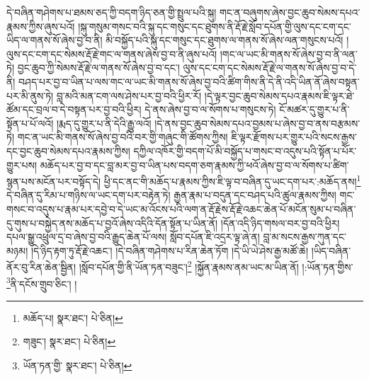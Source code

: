 དེ་བཞིན་གཤེགས་པ་ཐམས་ཅད་ཀྱི་བདག་ཉིད་ཅན་གྱི་སྤྲུལ་པའི་སྐུ། གང་ན་བཞུགས་ཞེས་བྱང་ཆུབ་སེམས་དཔའ་རྣམས་ཀྱིས་ཞུས་པའོ། །སྐུ་གསུམ་གསང་བའི་སྐུ་དང་གསུང་དང་ཐུགས་ནི་རྡོ་རྗེ་སློབ་དཔོན་གྱི་ལུས་དང་ངག་དང་ཡིད་ལ་གནས་སོ་ཞེས་བྱ་བ་ནི། མི་བསྐྱོད་པའི་སྐུ་དང་གསུང་དང་ཐུགས་ལ་གནས་སོ་ཞེས་ལན་གསུངས་པའོ། །ལུས་དང་ངག་དང་སེམས་རྡོ་རྗེ་གང་ལ་གནས་ཞེས་བྱ་བ་ནི་ཞུས་པའོ། །གང་ལ་ཡང་མི་གནས་སོ་ཞེས་བྱ་བ་ནི་ལན་ཏེ། བྱང་ཆུབ་ཀྱི་སེམས་རྡོ་རྗེ་ལ་གནས་སོ་ཞེས་བྱ་བ་དང་། ལུས་དང་ངག་དང་སེམས་རྡོ་རྗེ་ལ་གནས་སོ་ཞེས་བྱ་བ་དེ་ནི། བཤད་པར་བྱ་བ་ཡིན་པ་ལས་གང་ལ་ཡང་མི་གནས་སོ་ཞེས་བྱ་བའི་ཚིག་གིས་ནི་དེ་ནི་འདི་ཡིན་ནོ་ཞེས་བསྟན་པར་མི་ནུས་ཏེ། བླ་མའི་མན་ངག་ལས་ཤེས་པར་བྱ་བའི་ཕྱིར་རོ། །དེ་ལྟར་བྱང་ཆུབ་སེམས་དཔའ་རྣམས་ཇི་ལྟར་ཐེ་ཚོམ་དང་བྲལ་བ་དེ་བསྟན་པར་བྱ་བའི་ཕྱིར། དེ་ནས་ཞེས་བྱ་བ་ལ་སོགས་པ་གསུངས་ཏེ། ངོ་མཚར་དུ་གྱུར་པ་ནི་སྟོན་པ་པོ་ལའོ། །རྨད་དུ་གྱུར་པ་ནི་དེའི་རྒྱུ་ལའོ། །དེ་ནས་བྱང་ཆུབ་སེམས་དཔའ་བྱམས་པ་ཞེས་བྱ་བ་ནས་བརྩམས་ཏེ། གང་ན་ཡང་མི་གནས་སོ་ཞེས་བྱ་བའི་བར་གྱི་གཞུང་གི་ཚོགས་ཀྱིས། ཇི་ལྟར་རྫོགས་པར་གྱུར་པའི་སངས་རྒྱས་དང་བྱང་ཆུབ་སེམས་དཔའ་རྣམས་ཀྱིས། དཀྱིལ་འཁོར་གྱི་བདག་པོ་མི་བསྐྱོད་པ་གསང་བ་འདུས་པའི་སྟོན་པ་པོར་གྱུར་པས། མཆོད་པར་བྱ་བ་དང་བླ་མར་བྱ་བ་ཡིན་པས་བདག་ཅག་རྣམས་ཀྱི་ཕའོ་ཞེས་བྱ་བ་ལ་སོགས་པ་ཚིག་སྙན་པས་མངོན་པར་བསྟོད་དེ། ཕྱི་དང་ནང་གི་མཆོད་པ་རྣམས་ཀྱིས་ཇི་ལྟ་བ་བཞིན་དུ་ཡང་དག་པར་:མཆོད་ནས།\footnote{མཆོད་པ།  སྣར་ཐང་།  པེ་ཅིན། } དེ་བཞིན་དུ་རིམ་པ་གཉིས་ལ་ཡང་དག་པར་བརྟེན་ཏེ། རྒྱན་རྣམ་པ་བདུན་དང་བཤད་པའི་ཚུལ་རྣམས་ཀྱིས། གང་གསང་བ་འདུས་པ་རྣམ་པར་དབྱེ་བ་དེ་ཡང་མ་འོངས་པའི་ལག་ན་རྡོ་རྗེས་རྡོ་རྗེ་འཆང་ཆེན་པོ་མངོན་སུམ་པ་བཞིན་དུ་གུས་པ་བསྐྱེད་ནས་མཆོད་པ་བྱའོ་ཞེས་འདིའི་དོན་སྟོན་པ་ཡིན་ནོ། །དོན་འདི་ཉིད་གསལ་བར་བྱ་བའི་ཕྱིར། དཔལ་སྒྱུ་འཕྲུལ་དྲ་བ་ཞེས་བྱ་བའི་རྒྱུད་ཆེན་པོ་ལས། སློབ་དཔོན་ཇི་འདྲར་ལྟ་ཞེ་ན། བླ་མ་སངས་རྒྱས་ཀུན་དང་མཉམ། །དེ་ཉིད་རྟག་ཏུ་རྡོ་རྗེ་འཆང་། །དེ་བཞིན་གཤེགས་པ་རིན་ཆེན་ཏོག །དེ་ཡི་ཡེ་ཤེས་རྒྱ་མཚོ་ཆེ། །ཡིད་བཞིན་ནོར་བུ་རིན་ཆེན་སྦྱིན། །སློབ་དཔོན་གྱི་ནི་ཡོན་ཏན་བཟུང་།\footnote{གཟུང་།  སྣར་ཐང་།  པེ་ཅིན། } །སྐྱོན་རྣམས་ནམ་ཡང་མ་ཡིན་ནོ། །:ཡོན་ཏན་གྱིས་\footnote{ཡོན་ཏན་གྱི་  སྣར་ཐང་།  པེ་ཅིན། }ནི་དངོས་གྲུབ་ཅིང་། །
